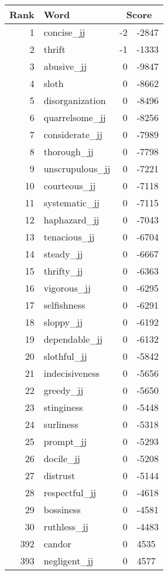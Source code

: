 \begin{longtable}[!htbp]{| rlr@{.}l |}
    \hline
    \textbf{Rank} & \textbf{Word} & \multicolumn{2}{c|}{\textbf{Score}} \\
    \hline
    \endhead
    1 & concise\_jj & -2 & -2847 \\
    2 & thrift & -1 & -1333 \\
    3 & abusive\_jj & 0 & -9847 \\
    4 & sloth & 0 & -8662 \\
    5 & disorganization & 0 & -8496 \\
    6 & quarrelsome\_jj & 0 & -8256 \\
    7 & considerate\_jj & 0 & -7989 \\
    8 & thorough\_jj & 0 & -7798 \\
    9 & unscrupulous\_jj & 0 & -7221 \\
    10 & courteous\_jj & 0 & -7118 \\
    11 & systematic\_jj & 0 & -7115 \\
    12 & haphazard\_jj & 0 & -7043 \\
    13 & tenacious\_jj & 0 & -6704 \\
    14 & steady\_jj & 0 & -6667 \\
    15 & thrifty\_jj & 0 & -6363 \\
    16 & vigorous\_jj & 0 & -6295 \\
    17 & selfishness & 0 & -6291 \\
    18 & sloppy\_jj & 0 & -6192 \\
    19 & dependable\_jj & 0 & -6132 \\
    20 & slothful\_jj & 0 & -5842 \\
    21 & indecisiveness & 0 & -5656 \\
    22 & greedy\_jj & 0 & -5650 \\
    23 & stinginess & 0 & -5448 \\
    24 & surliness & 0 & -5318 \\
    25 & prompt\_jj & 0 & -5293 \\
    26 & docile\_jj & 0 & -5208 \\
    27 & distrust & 0 & -5144 \\
    28 & respectful\_jj & 0 & -4618 \\
    29 & bossiness & 0 & -4581 \\
    30 & ruthless\_jj & 0 & -4483 \\
    392 & candor & 0 & 4535 \\
    393 & negligent\_jj & 0 & 4577 \\

\end{longtable}
